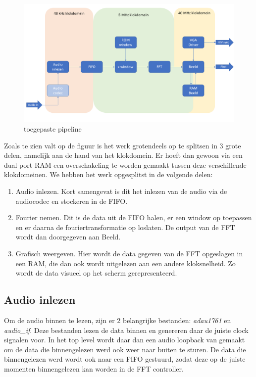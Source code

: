 \documentclass[a4paper,kul]{kulakarticle} %
\begin{document}
\begin{figure}[H]
	\centering
	\includegraphics[width=0.7\linewidth]{Pipeline.png}
	\caption{toegepaste pipeline}
	\label{fig:toegepastePipeline}
\end{figure}

Zoals te zien valt op de figuur is het werk grotendeels op te splitsen in 3 grote delen, namelijk aan de hand van het klokdomein. Er hoeft dan gewoon via een dual-port-RAM een overschakeling te worden gemaakt tussen deze verschillende klokdomeinen. We hebben het werk opgesplitst in de volgende delen:

\begin{enumerate}
	\item Audio inlezen. Kort samengevat is dit het inlezen van de audio via de audiocodec en stockeren in de FIFO.
	\item Fourier nemen. Dit is de data uit de FIFO halen, er een window op toepassen en er daarna de fouriertransformatie op loslaten. De output van de FFT wordt dan doorgegeven aan Beeld.
	\item Grafisch weergeven. Hier wordt de data gegeven van de FFT opgeslagen in een RAM, die dan ook wordt uitgelezen aan een andere kloksnelheid. Zo wordt de data visueel op het scherm gerepresenteerd.
\end{enumerate}

\subsection{Audio inlezen}

Om de audio binnen te lezen, zijn er 2 belangrijke bestanden: \textit{adau1761} en \textit{audio\_if}. Deze bestanden lezen de data binnen en genereren daar de juiste clock signalen voor. In het top level wordt daar dan een audio loopback van gemaakt om de data die binnengelezen werd ook weer naar buiten te sturen. De data die binnengelezen werd wordt ook naar een FIFO gestuurd, zodat deze op de juiste momenten binnengelezen kan worden in de FFT controller.
\end{document}
